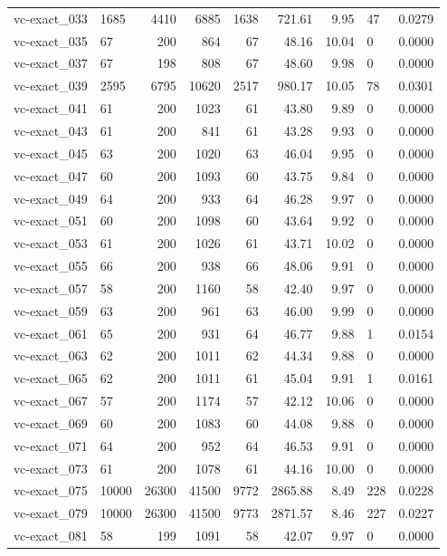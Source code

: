 \begin{longtable}{llrrrrrll}
vc-exact\_033 & 1685 & 4410 & 6885 & 1638 & 721.61 & 9.95 & 47 & 0.0279 \\
vc-exact\_035 & 67 & 200 & 864 & 67 & 48.16 & 10.04 & 0 & 0.0000 \\
vc-exact\_037 & 67 & 198 & 808 & 67 & 48.60 & 9.98 & 0 & 0.0000 \\
vc-exact\_039 & 2595 & 6795 & 10620 & 2517 & 980.17 & 10.05 & 78 & 0.0301 \\
vc-exact\_041 & 61 & 200 & 1023 & 61 & 43.80 & 9.89 & 0 & 0.0000 \\
vc-exact\_043 & 61 & 200 & 841 & 61 & 43.28 & 9.93 & 0 & 0.0000 \\
vc-exact\_045 & 63 & 200 & 1020 & 63 & 46.04 & 9.95 & 0 & 0.0000 \\
vc-exact\_047 & 60 & 200 & 1093 & 60 & 43.75 & 9.84 & 0 & 0.0000 \\
vc-exact\_049 & 64 & 200 & 933 & 64 & 46.28 & 9.97 & 0 & 0.0000 \\
vc-exact\_051 & 60 & 200 & 1098 & 60 & 43.64 & 9.92 & 0 & 0.0000 \\
vc-exact\_053 & 61 & 200 & 1026 & 61 & 43.71 & 10.02 & 0 & 0.0000 \\
vc-exact\_055 & 66 & 200 & 938 & 66 & 48.06 & 9.91 & 0 & 0.0000 \\
vc-exact\_057 & 58 & 200 & 1160 & 58 & 42.40 & 9.97 & 0 & 0.0000 \\
vc-exact\_059 & 63 & 200 & 961 & 63 & 46.00 & 9.99 & 0 & 0.0000 \\
vc-exact\_061 & 65 & 200 & 931 & 64 & 46.77 & 9.88 & 1 & 0.0154 \\
vc-exact\_063 & 62 & 200 & 1011 & 62 & 44.34 & 9.88 & 0 & 0.0000 \\
vc-exact\_065 & 62 & 200 & 1011 & 61 & 45.04 & 9.91 & 1 & 0.0161 \\
vc-exact\_067 & 57 & 200 & 1174 & 57 & 42.12 & 10.06 & 0 & 0.0000 \\
vc-exact\_069 & 60 & 200 & 1083 & 60 & 44.08 & 9.88 & 0 & 0.0000 \\
vc-exact\_071 & 64 & 200 & 952 & 64 & 46.53 & 9.91 & 0 & 0.0000 \\
vc-exact\_073 & 61 & 200 & 1078 & 61 & 44.16 & 10.00 & 0 & 0.0000 \\
vc-exact\_075 & 10000 & 26300 & 41500 & 9772 & 2865.88 & 8.49 & 228 & 0.0228 \\
vc-exact\_079 & 10000 & 26300 & 41500 & 9773 & 2871.57 & 8.46 & 227 & 0.0227 \\
vc-exact\_081 & 58 & 199 & 1091 & 58 & 42.07 & 9.97 & 0 & 0.0000 \\

\end{longtable}
